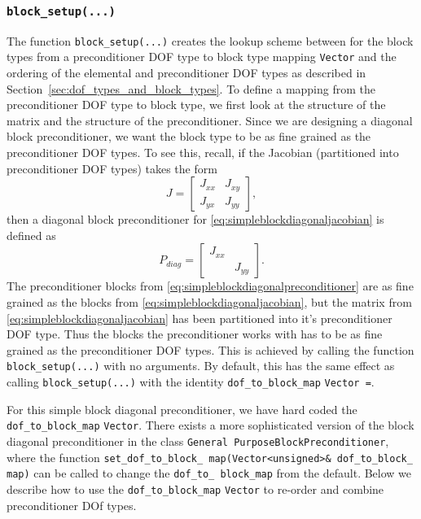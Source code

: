 \subsubsection{\texttt{block\_setup(...)}\label{sec:block_setup}}
The function \texttt{block\_\allowbreak setup(...)} creates the lookup scheme
between for the block types from a preconditioner DOF type to block type
mapping \texttt{Vector} and the ordering of the elemental and preconditioner
DOF types as described in Section~\ref{sec:dof_types_and_block_types}. To
define a mapping from the preconditioner DOF type to block type, we first look
at the structure of the matrix and the structure of the preconditioner. Since
we are designing a diagonal block preconditioner, we want the block type to be
as fine grained as the preconditioner DOF types. To see this, recall, if the
Jacobian (partitioned into preconditioner DOF types) takes the form 
\begin{equation}
J =
\begin{bmatrix}
J_{xx}&J_{xy} \\
J_{yx}&J_{yy}
\end{bmatrix},
\label{eq:simpleblockdiagonaljacobian}
\end{equation}
then a diagonal block preconditioner for \eqref{eq:simpleblockdiagonaljacobian}
is defined as
\begin{equation*}
P_{diag} =
\begin{bmatrix}
J_{xx}& \\
      &J_{yy}
\end{bmatrix}.
\label{eq:simpleblockdiagonalpreconditioner}
\end{equation*}
The preconditioner blocks from \eqref{eq:simpleblockdiagonalpreconditioner} are
as fine grained as the blocks from \eqref{eq:simpleblockdiagonaljacobian}, but
the matrix from \eqref{eq:simpleblockdiagonaljacobian} has been partitioned
into it's preconditioner DOF type. Thus the blocks the preconditioner works
with has to be as fine grained as the preconditioner DOF types. This is achieved
by calling the function \texttt{block\_\allowbreak setup(...)} with no
arguments. By default, this has the same effect as calling
\texttt{block\_\allowbreak setup(...)} with the identity
\texttt{dof\_\allowbreak to\_\allowbreak block\_\allowbreak map} \texttt{Vector
  \allowbreak =\allowbreak [0 1]}.


For this simple block diagonal preconditioner, we have hard coded the
\texttt{dof\_\allowbreak to\_\allowbreak block\_\allowbreak map}
\texttt{Vector}. There exists a more sophisticated version of the block
diagonal preconditioner in the class \texttt{General\allowbreak
  Purpose\allowbreak Block\allowbreak Preconditioner}, where the function
\texttt{set\_\allowbreak dof\_\allowbreak to\_\allowbreak block\_\allowbreak
  map(Vector<unsigned>\& dof\_\allowbreak to\_\allowbreak block\_\allowbreak
  map)} can be called to change the \texttt{dof\_\allowbreak to\_\allowbreak
  block\_\allowbreak map} from the default. Below we describe how to use the \texttt{dof\_\allowbreak to\_\allowbreak block\_\allowbreak map}
\texttt{Vector} to re-order and combine preconditioner DOf types.

